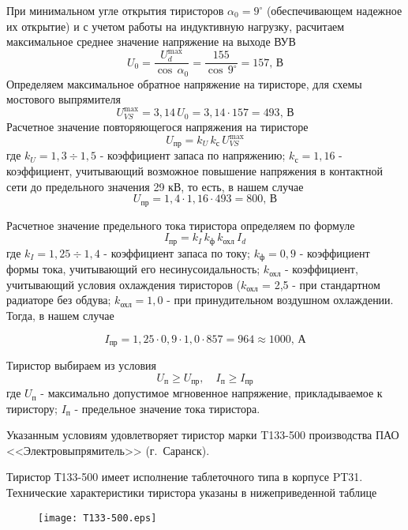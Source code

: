 При минимальном угле открытия тиристоров $\alpha_0 = 9^\circ$ (обеспечивающем надежное их открытие) и с учетом работы на индуктивную нагрузку, расчитаем максимальное среднее значение напряжение на выходе ВУВ
\begin{equation*}
 U_0 = \frac{U_d^{\max}}{\cos \, \alpha_0} = \frac{155}{\cos \, 9^{\circ}} = 157, \, \text{В}
\end{equation*}
Определяем максимальное обратное напряжение на тиристоре, для схемы мостового выпрямителя
\begin{equation*}
 U_{VS}^{\max} = 3,14 \, U_0 = 3,14 \cdot 157 = 493, \, \text{В}
\end{equation*}
Расчетное значение повторяющегося напряжения на тиристоре
\begin{equation*}
 U_{\text{пр}} = k_{U} \, k_{\text{с}} \, U_{VS}^{\max} 
\end{equation*}
где $k_{U} = 1,3 \div 1,5$ - коэффициент запаса по напряжению; $k_{\text{с}} = 1,16$ - коэффициент, учитывающий возможное повышение напряжения в контактной сети до предельного значения 29 кВ, то есть, в нашем случае
\begin{equation*}
 U_{\text{пр}} = 1,4 \cdot 1,16 \cdot 493 = 800, \, \text{В} 
\end{equation*}

Расчетное значение предельного тока тиристора определяем по формуле
\begin{equation*}
 I_{\text{пр}} = k_I \, k_{\text{ф}} \, k_{\text{охл}} \, I_d
\end{equation*}
где $k_I = 1,25 \div 1,4$ - коэффициент запаса по току; $k_{\text{ф}} = 0,9$ - коэффициент формы тока, учитывающий его несинусоидальность; $k_{\text{охл}}$ - коэффициент, учитывающий условия охлаждения тиристоров ($k_{\text{охл}}$ = 2,5 - при стандартном радиаторе без обдува; $k_{\text{охл}} = 1,0$ - при принудительном воздушном охлаждении. Тогда, в нашем случае

\begin{equation*}
 I_{\text{пр}} = 1,25 \cdot 0,9 \cdot 1,0 \cdot 857 = 964 \approx 1000, \, \text{А}
\end{equation*}

Тиристор выбираем из условия 
\begin{equation*}
 U_{\text{п}} \ge U_{\text{пр}}, \quad I_{\text{п}} \ge I_{\text{пр}}
\end{equation*}
где $U_{\text{п}}$ - максимально допустимое мгновенное напряжение, прикладываемое к тиристору; $I_{\text{п}}$ - предельное значение тока тиристора.

Указанным условиям удовлетворяет тиристор  марки T133-500 производства ПАО <<Электровыпрямитель>> (г.~Саранск).

Тиристор Т133-500 имеет исполнение таблеточного типа в корпусе PT31. Технические характеристики тиристора указаны в нижеприведенной таблице

\begin{figure}[H]
    \centering        
    \texttt{[image: T133-500.eps]}    
    \label{fig:T133-500}
\end{figure}





